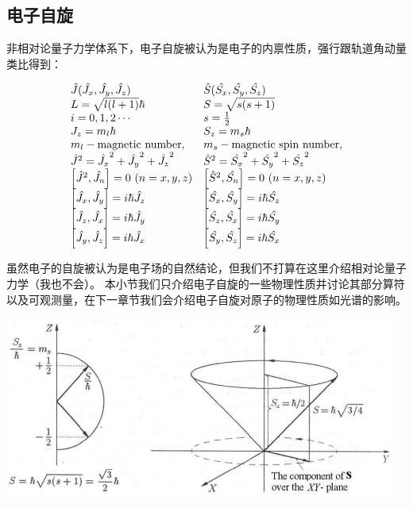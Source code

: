 \subsection{电子自旋}
非相对论量子力学体系下，电子自旋被认为是电子的内禀性质，强行跟轨道角动量类比得到：

\[
    \begin{array}{ll}
        \hat{J}(\hat{J_x},\hat{J_y},\hat{J_z}) & \hat{S}(\hat{S_x},\hat{S_y},\hat{S_z}) \\
        L=\sqrt{l(l+1)}\hbar & S=\sqrt{s(s+1)}\\
        i=0,1,2 \cdots & s=\frac{1}{2}\\
        J_z=m_l\hbar & S_z=m_s\hbar\\
        m_l - \text{magnetic number}, & m_s - \text{magnetic spin number},\\
        \hat{J}^2=\hat{J_x}^2+\hat{J_y}^2+\hat{J_z}^2 & \hat{S}^2=\hat{S_x}^2+\hat{S_y}^2+\hat{S_z}^2 \\
        \qty[\hat{J}^2,\hat{J_n}]=0 \ (n=x,y,z) & \qty[\hat{S}^2,\hat{S_n}]=0 \ (n=x,y,z)\\
        \qty[\hat{J_x},\hat{J_y}]=i\hbar\hat{J_z} & \qty[\hat{S_x},\hat{S_y}]=i\hbar\hat{S_z}\\
        \qty[\hat{J_z},\hat{J_x}]=i\hbar\hat{J_y} & \qty[\hat{S_z},\hat{S_x}]=i\hbar\hat{S_y}\\
        \qty[\hat{J_y},\hat{J_z}]=i\hbar\hat{J_x} & \qty[\hat{S_y},\hat{S_z}]=i\hbar\hat{S_x}
    \end{array}
\]

虽然电子的自旋被认为是电子场的自然结论，但我们不打算在这里介绍相对论量子力学（我也不会）。
本小节我们只介绍电子自旋的一些物理性质并讨论其部分算符以及可观测量，在下一章节我们会介绍电子自旋对原子的物理性质如光谱的影响。

\begin{center}
    \includegraphics[scale=0.7]{fig/lzhx/微信图片_20211028113518}
\end{center}

